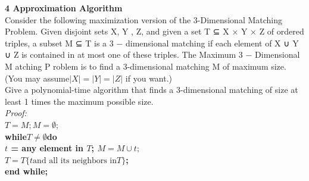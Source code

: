 \documentclass[11pt]{article}
\begin{document}
\begin{CJK}{UTF8}{gkai}
\noindent
{\bf \large  4 Approximation Algorithm}\\[2mm]
Consider the following maximization version of the 3-Dimensional Matching
Problem. Given disjoint sets X, Y , Z, and given a set T ⊆ X × Y × Z
of ordered triples, a subset M ⊆ T is a 3 − dimensional matching if each
element of X ∪ Y ∪ Z is contained in at most one of these triples. The
Maximum 3 − Dimensional M atching P roblem is to find a 3-dimensional
matching M of maximum size. (You may assume$ |X| = |Y| = |Z|$ if you
want.)\\
Give a polynomial-time algorithm that finds a 3-dimensional matching of
size at least 1 times the maximum possible size.\\
\emph{Proof:}\\
$T = M ; M =\emptyset;$\\ 
\bf{while}$T\neq\emptyset$\bf{do}\\
$t$ = any element in $T$;
$M = M \cup {t};$\\
$T = T \{t \text{and all its neighbors in} T \}$;\\
\bf{end while;}\\




\end{CJK}
\end{document}
